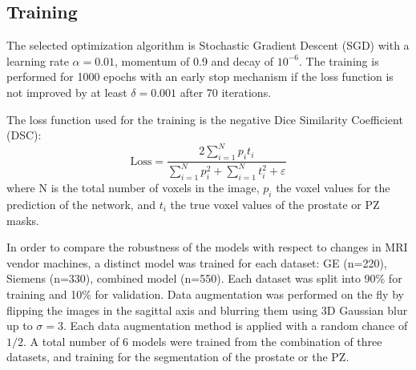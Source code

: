 \subsection{Training}
\label{subsec:training}
The selected optimization algorithm is Stochastic Gradient Descent (SGD) with a learning rate $\alpha = 0.01$, momentum of 0.9 and decay of $10^{-6}$. The training is performed for 1000 epochs with an early stop mechanism if the loss function is not improved by at least $\delta = 0.001$ after 70 iterations. 

The loss function used for the training is the negative Dice Similarity Coefficient (DSC):
\begin{equation}
\text{Loss} = \frac{2 \sum_{i=1}^{N}p_it_i}{\sum_{i=1}^{N}p_i^2 + \sum_{i=1}^{N}t_i^2 + \varepsilon} 
\label{eq:dsc}
\end{equation}
where N is the total number of voxels in the image, $p_i$ the voxel values for the prediction of the network, and $t_i$ the true voxel values of the prostate or PZ masks.

In order to compare the robustness of the models with respect to changes in MRI vendor machines,  a distinct model was trained for each dataset: GE (n=220), Siemens (n=330), combined model (n=550). Each dataset was split into 90\% for training and 10\% for validation. Data augmentation was performed on the fly by flipping the images in the sagittal axis and blurring them using 3D Gaussian blur up to $\sigma = 3$. Each data augmentation method is applied with a random chance of $1/2$.  
A total number of 6 models were trained from the combination of three datasets, and training for the segmentation of the prostate or the PZ. 
